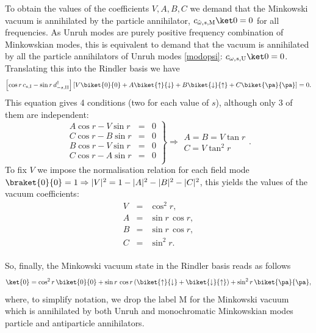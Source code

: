 To obtain the values of the coefficients $V,A,B,C$ we demand that the Minkowski vacuum is annihilated by the particle annihilator, $c_{\hat\omega, s,\text{M}}\ket0=0$ for all frequencies. As Unruh modes are purely positive frequency combination of Minkowskian modes, this is equivalent to demand that the vacuum is annihilated by all the particle annihilators of Unruh modes \eqref{modopsi}: $c_{\omega, s,\text{U}}\ket0=0$. Translating this into the Rindler basis we have
\begin{equation}\label{annihil2}
\left[\cos r\,c_{s,\text{I}}-\sin r\,d^\dagger_{-s,\text{II}}\right]\left[V\biket{0}{0}+A\biket{\uparrow}{\downarrow}+B\biket{\downarrow}{\uparrow}+ C\biket{\pa}{\pa}\right]=0.
\end{equation}
This equation gives 4 conditions (two for each value of $s$), although only 3 of them are independent:
\begin{equation}
\left.\begin{array}{lcr}
A\cos r - V\sin r&=&0\\
C\cos r - B\sin r&=&0\\
B\cos r - V\sin r&=&0\\
C\cos r - A\sin r&=&0\\
\end{array}\right\}\Rightarrow \begin{array}{ll}A=B=V \tan r\\
C=V\tan^2 r
\end{array}.
\end{equation}
To fix $V$ we impose the normalisation relation for each field mode $\braket{0}{0}=1\Rightarrow |V|^2=1-|A|^2-|B|^2-|C|^2$, this yields the values of the vacuum coefficients:
\begin{equation}\label{vaccoef}
\begin{array}{lcl}
V&=&\cos^2 r,\\
A&=&\sin r\,\cos r, \\
B&=&\sin r\,\cos r,\\
C&=&\sin^2 r.\\
\end{array}
\end{equation}

So, finally, the Minkowski vacuum state in the Rindler basis reads as follows
\begin{equation}\label{vacuum}
 \ket{0}=\cos^2 r\,\biket{0}{0}+\sin r\,\cos r\left(\biket{\uparrow}{\downarrow}+\biket{\downarrow}{\uparrow}\right)+\sin^2 r\,\biket{\pa}{\pa},
\end{equation}
where, to simplify notation, we drop the label M for the Minkowski vacuum which is annihilated by both Unruh and monochromatic Minkowskian modes particle and antiparticle annihilators.

